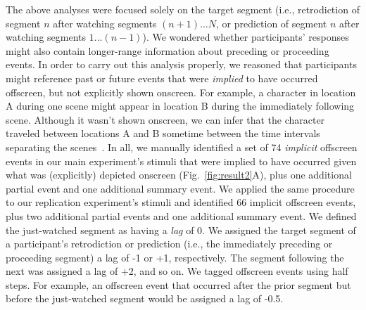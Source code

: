 \documentclass[10pt]{article}
\begin{document}
The above analyses were focused solely on the target segment (i.e., retrodiction of segment $n$ after watching segments $(n+1)...N$, or prediction of segment $n$ after watching segments $1 ...(n-1)$). We wondered whether participants' responses might also contain longer-range information about preceding or proceeding events. In order to carry out this analysis properly, we reasoned that participants might reference past or future events that were \textit{implied} to have occurred offscreen, but not explicitly shown onscreen. For example, a character in location A during one scene might appear in location B during the immediately following scene. Although it wasn't shown onscreen, we can infer that the character traveled between locations A and B sometime between the time intervals separating the scenes~\citep{Bord08}. In all, we manually identified a set of 74 \textit{implicit} offscreen events in our main experiment's stimuli that were implied to have occurred given what was (explicitly) depicted onscreen (Fig.~\ref{fig:result2}A), plus one additional partial event and one additional summary event. We applied the same procedure to our replication experiment's stimuli and identified 66 implicit offscreen events, plus two additional partial events and one additional summary event. We defined the just-watched segment as having a \textit{lag} of 0. We assigned the target segment of a participant's retrodiction or prediction (i.e., the immediately preceding or proceeding segment) a lag of -1 or +1, respectively. The segment following the next was assigned a lag of +2, and so on. We tagged offscreen events using half steps. For example, an offscreen event that occurred after the prior segment but before the just-watched segment would be assigned a lag of -0.5.
\end{document}
